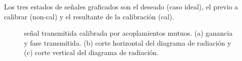 Los tres estados de señales graficados son el deseado (caso ideal), el previo a calibrar (non-cal) y el resultante de la
calibración (cal).
\begin{figure}[H]
	\centering

	\caption{señal transmitida calibrada por acoplamientos mutuos. (a) ganancia y fase transmitida. (b) corte horizontal del 
	diagrama de radiación y (c) corte vertical del diagrama de radiación.}
	\label{fig:compErrMutual10degRow}
\end{figure}

